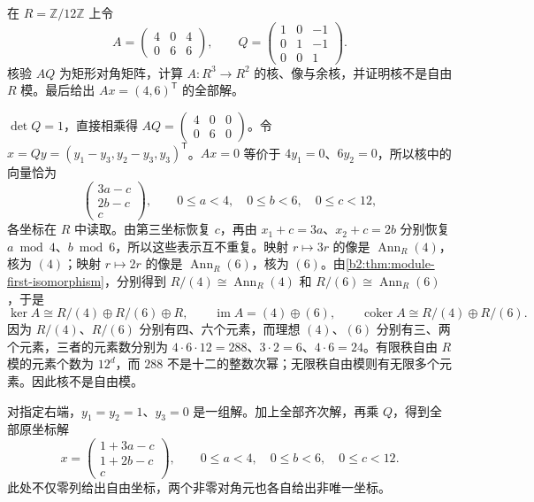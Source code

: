\begin{exercise}\label{b2:ex:A-zero-divisor-kernel}
	在 \(R=\mathbb Z/12\mathbb Z\) 上令
	\[
		A=\begin{pmatrix}4&0&4\\0&6&6\end{pmatrix},\qquad
		Q=\begin{pmatrix}1&0&-1\\0&1&-1\\0&0&1\end{pmatrix}.
	\]
	核验 \(AQ\) 为矩形对角矩阵，计算 \(A:R^3\to R^2\) 的核、像与余核，并证明核不是自由 \(R\) 模。最后给出 \(Ax=(4,6)^{\mathsf T}\) 的全部解。
\end{exercise}
\begin{solution}
	\(\det Q=1\)，直接相乘得 \(AQ=\begin{pmatrix}4&0&0\\0&6&0\end{pmatrix}\)。令 \(x=Qy=(y_1-y_3,y_2-y_3,y_3)^{\mathsf T}\)。\(Ax=0\) 等价于 \(4y_1=0\)、\(6y_2=0\)，所以核中的向量恰为
	\[
		\begin{pmatrix}3a-c\\2b-c\\c\end{pmatrix},
		\qquad 0\le a<4,\quad0\le b<6,\quad0\le c<12,
	\]
	各坐标在 \(R\) 中读取。由第三坐标恢复 \(c\)，再由 \(x_1+c=3a\)、\(x_2+c=2b\) 分别恢复 \(a\bmod4\)、\(b\bmod6\)，所以这些表示互不重复。映射 \(r\mapsto3r\) 的像是 \(\operatorname{Ann}_R(4)\)，核为 \((4)\)；映射 \(r\mapsto2r\) 的像是 \(\operatorname{Ann}_R(6)\)，核为 \((6)\)。由\cref{b2:thm:module-first-isomorphism}，分别得到 \(R/(4)\cong\operatorname{Ann}_R(4)\) 和 \(R/(6)\cong\operatorname{Ann}_R(6)\)，于是
	\[
		\ker A\cong R/(4)\oplus R/(6)\oplus R, \qquad \operatorname{im}A=(4)\oplus(6), \qquad \operatorname{coker}A\cong R/(4)\oplus R/(6).
	\]
	因为 \(R/(4)\)、\(R/(6)\) 分别有四、六个元素，而理想 \((4)\)、\((6)\) 分别有三、两个元素，三者的元素数分别为 \(4\cdot6\cdot12=288\)、\(3\cdot2=6\)、\(4\cdot6=24\)。有限秩自由 \(R\) 模的元素个数为 \(12^d\)，而 \(288\) 不是十二的整数次幂；无限秩自由模则有无限多个元素。因此核不是自由模。

	对指定右端，\(y_1=y_2=1\)、\(y_3=0\) 是一组解。加上全部齐次解，再乘 \(Q\)，得到全部原坐标解
	\[
		x=\begin{pmatrix}1+3a-c\\1+2b-c\\c\end{pmatrix},
		\qquad0\le a<4,\quad0\le b<6,\quad0\le c<12.
	\]
	此处不仅零列给出自由坐标，两个非零对角元也各自给出非唯一坐标。
\end{solution}

